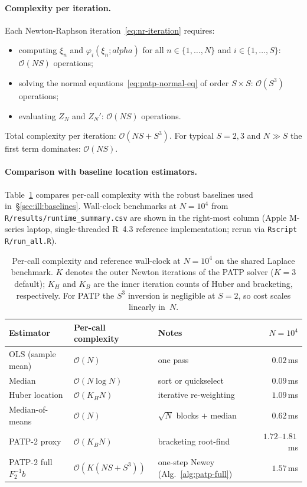 \documentclass[11pt]{article}
\def\alpha{alpha}%
\def\mathbf#1{#1}%
\def\mathrm#1{#1}%
\theoremstyle{definition}
\begin{document}
\paragraph{Complexity per iteration.}
Each Newton-Raphson iteration~\eqref{eq:nr-iteration} requires:
\begin{itemize}
  \item computing $\xi_n$ and $\varphi_i(\xi_n; \alpha)$ for all
        $n \in \{1, \ldots, N\}$ and $i \in \{1, \ldots, S\}$:
        $\mathcal{O}(N S)$ operations;
  \item solving the normal equations~\eqref{eq:patp-normal-eq}
        of order $S \times S$: $\mathcal{O}(S^3)$ operations;
  \item evaluating $Z_N$ and $Z_N'$: $\mathcal{O}(N S)$ operations.
\end{itemize}
Total complexity per iteration: $\mathcal{O}(N S + S^3)$. For typical
$S = 2, 3$ and $N \gg S$ the first term dominates: $\mathcal{O}(N S)$.

\paragraph{Comparison with baseline location estimators.}
Table~\ref{tab:complexity} compares per-call complexity with the robust
baselines used in~\S\ref{sec:ill:baselines}. Wall-clock benchmarks at
$N=10^4$ from \texttt{R/results/runtime\_summary.csv} are shown in the
right-most column (Apple M-series laptop, single-threaded R~4.3 reference
implementation; rerun via \texttt{Rscript R/run\_all.R}).

\begin{table}[!htb]
\centering
\small
\begin{tabular}{l l l r}
\toprule
Estimator & Per-call complexity & Notes & $N=10^4$ \\
\midrule
OLS (sample mean) & $\mathcal{O}(N)$ & one pass & $0.02$\,ms \\
Median            & $\mathcal{O}(N\log N)$ & sort or quickselect & $0.09$\,ms \\
Huber location    & $\mathcal{O}(K_{\mathrm H}N)$ & iterative re-weighting & $1.09$\,ms \\
Median-of-means   & $\mathcal{O}(N)$ & $\sqrt{N}$ blocks $+$ median & $0.62$\,ms \\
PATP-2 proxy      & $\mathcal{O}(K_{\mathrm B}N)$ & bracketing root-find & $1.72$--$1.81$\,ms \\
PATP-2 full $\mathbf{F}_2^{-1}\mathbf{b}$ & $\mathcal{O}(K(NS+S^3))$ & one-step Newey (Alg.~\ref{alg:patp-full}) & $1.57$\,ms \\
\bottomrule
\end{tabular}
\caption{Per-call complexity and reference wall-clock at $N=10^4$ on the
shared Laplace benchmark. $K$ denotes the outer Newton iterations of the
PATP solver ($K=3$ default); $K_{\mathrm H}$ and $K_{\mathrm B}$ are the
inner iteration counts of Huber and bracketing, respectively. For PATP the
$S^3$ inversion is negligible at $S=2$, so cost scales linearly in~$N$.}
\label{tab:complexity}
\end{table}
\end{document}
